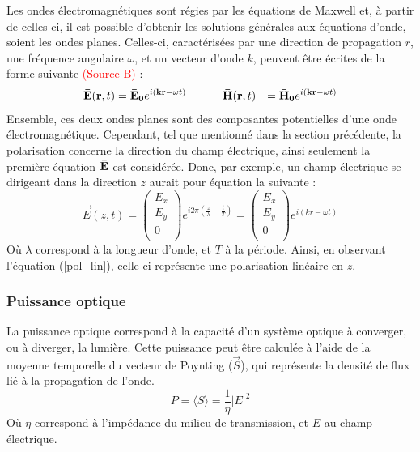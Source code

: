 \documentclass[11pt,letterpaper]{article}
\begin{document}
Les ondes électromagnétiques sont régies par les équations de Maxwell et, à partir de celles-ci, il est possible d'obtenir les solutions générales aux équations d'onde, soient les ondes planes. Celles-ci, caractérisées par une direction de propagation $r$, une fréquence angulaire $\omega$, et un vecteur d'onde $k$, peuvent être écrites de la forme suivante \textcolor{red}{(Source B)} :
\begin{equation}
  \begin{aligned}
  \mathbf{\Bar{E}}(\textbf{r},t)&=\mathbf{\Bar{E}_{0}}e^{i(\mathbf{kr}-\omega t)} & \;\;\;\;\;\;\;\; & \mathbf{\Bar{H}}(\mathbf{r},t)&=\mathbf{\Bar{H}_{0}}e^{i(\mathbf{kr}-\omega t)} \\
  \end{aligned}
  \label{champs}
\end{equation}
Ensemble, ces deux ondes planes sont des composantes potentielles d'une onde électromagnétique. Cependant, tel que mentionné dans la section précédente, la polarisation concerne la direction du champ électrique, ainsi seulement la première équation $\mathbf{\Bar{E}}$ est considérée. Donc, par exemple, un champ électrique se dirigeant dans la direction $z$ aurait pour équation la suivante :
\begin{equation}
  \vec{E}(z,t)=
  \begin{pmatrix}
    E_{x} \\
    E_{y} \\
    0 \\
  \end{pmatrix}
  e^{i2\pi(\frac{z}{\lambda}-\frac{t}{T})}=
  \begin{pmatrix}
    E_{x} \\
    E_{y} \\
    0 \\
  \end{pmatrix}
  e^{i(kr-\omega t)}
\end{equation}
Où $\lambda$ correspond à la longueur d'onde, et $T$ à la période. Ainsi, en observant l'équation (\ref{pol_lin}), celle-ci représente une polarisation linéaire en $z$.


\subsubsection{Puissance optique}
La puissance optique correspond à la capacité d'un système optique à converger, ou à diverger, la lumière. Cette puissance peut être calculée à l'aide de la moyenne temporelle du vecteur de Poynting ($\vec{S}$), qui représente la densité de flux lié à la propagation de l'onde.
\begin{equation}
  P=\langle S\rangle=\frac{1}{\eta}|E|^{2}
\end{equation}
Où $\eta$ correspond à l'impédance du milieu de transmission, et $E$ au champ électrique.
\end{document}
